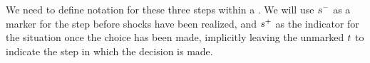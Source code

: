   We need to define notation for these three steps within a {\interval}. We will use $s^{-}$ as a marker for the step before shocks have been realized, and $s^{+}$ as the indicator for the situation once the choice has been made, implicitly leaving the unmarked $t$ to indicate the step in which the decision is made.
